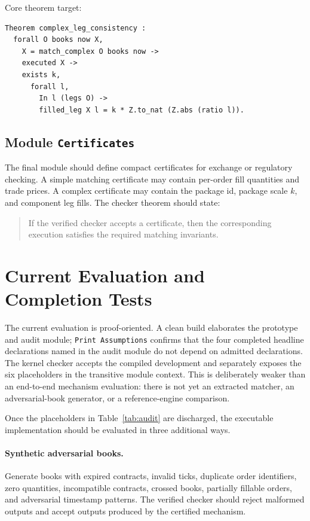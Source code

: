 \documentclass[11pt]{article}
\begin{document}
Core theorem target:

\begin{lstlisting}
Theorem complex_leg_consistency :
  forall O books now X,
    X = match_complex O books now ->
    executed X ->
    exists k,
      forall l,
        In l (legs O) ->
        filled_leg X l = k * Z.to_nat (Z.abs (ratio l)).
\end{lstlisting}

\subsection{Module \texttt{Certificates}}

The final module should define compact certificates for exchange or regulatory checking. A simple matching certificate may contain per-order fill quantities and trade prices. A complex certificate may contain the package id, package scale \(k\), and component leg fills. The checker theorem should state:
\begin{quote}
If the verified checker accepts a certificate, then the corresponding execution satisfies the required matching invariants.
\end{quote}

\section{Current Evaluation and Completion Tests}

The current evaluation is proof-oriented. A clean build elaborates the prototype and audit module; \texttt{Print Assumptions} confirms that the four completed headline declarations named in the audit module do not depend on admitted declarations. The kernel checker accepts the compiled development and separately exposes the six placeholders in the transitive module context. This is deliberately weaker than an end-to-end mechanism evaluation: there is not yet an extracted matcher, an adversarial-book generator, or a reference-engine comparison.

Once the placeholders in Table~\ref{tab:audit} are discharged, the executable implementation should be evaluated in three additional ways.

\paragraph{Synthetic adversarial books.}
Generate books with expired contracts, invalid ticks, duplicate order identifiers, zero quantities, incompatible contracts, crossed books, partially fillable orders, and adversarial timestamp patterns. The verified checker should reject malformed outputs and accept outputs produced by the certified mechanism.
\end{document}
